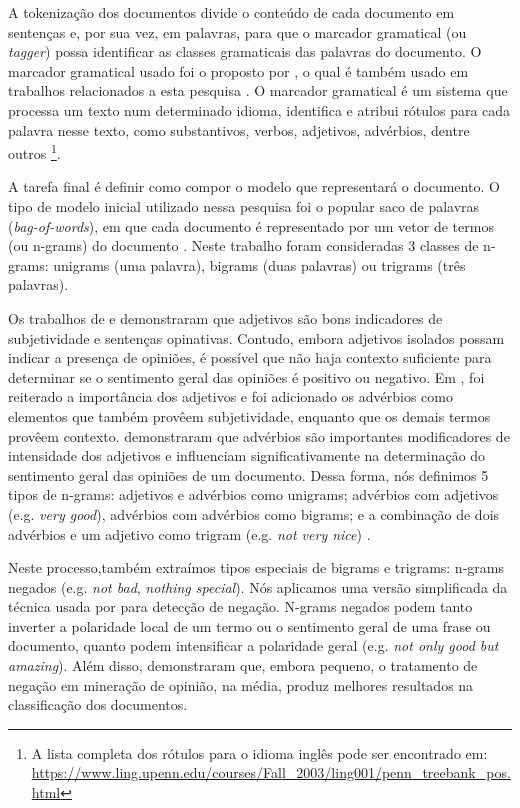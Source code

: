 \documentclass[template.tex]{subfiles}
\begin{document}
A tokenização dos documentos divide o conteúdo de cada documento em sentenças e, por sua vez, em palavras, para que o marcador gramatical (ou \textit{tagger}) possa identificar as classes gramaticais das palavras do documento. O marcador gramatical usado foi o proposto por , o qual é também usado em trabalhos relacionados a esta pesquisa \cite{chaovalit2005movie, taboada2008extracting, taboada2011lexicon}. O marcador gramatical é um sistema que processa um texto num determinado idioma, identifica e atribui rótulos para cada palavra nesse texto, como substantivos, verbos, adjetivos, advérbios, dentre outros \footnote{A lista completa dos rótulos para o idioma inglês pode ser encontrado em: \url{https://www.ling.upenn.edu/courses/Fall_2003/ling001/penn_treebank_pos.html}}. 

A tarefa final é definir como compor o modelo que representará o documento. O tipo de modelo inicial utilizado nessa pesquisa foi o popular saco de palavras (\textit{bag-of-words}), em que cada documento é representado por um vetor de termos (ou n-grams) do documento \cite{moraes2012document}. Neste trabalho foram consideradas 3 classes de n-grams: unigrams (uma palavra), bigrams (duas palavras) ou trigrams (três palavras). 

Os trabalhos de  e  demonstraram que adjetivos são bons indicadores de subjetividade e sentenças opinativas. Contudo, embora adjetivos isolados possam indicar a presença de opiniões, é possível que não haja contexto suficiente para determinar se o sentimento geral das opiniões é positivo ou negativo. Em , foi reiterado a importância dos adjetivos e  foi adicionado os advérbios como elementos que também provêem subjetividade, enquanto que os demais termos provêem contexto.  demonstraram que advérbios são importantes modificadores de intensidade dos adjetivos e influenciam significativamente na determinação do sentimento geral das opiniões de um documento. Dessa forma, nós definimos 5 tipos de n-grams: adjetivos e advérbios como unigrams; advérbios com adjetivos (e.g. \textit{very good}), advérbios com advérbios como bigrams; e a combinação de dois advérbios e um adjetivo como trigram (e.g. \textit{not very nice}) \cite{pang2002thumbs, turney2002thumbs, taboada2008extracting, karamibekr2012verb}. 

Neste processo,também extraímos tipos especiais de bigrams e trigrams: n-grams negados (e.g. \textit{not bad}, \textit{nothing special}). Nós aplicamos uma versão simplificada da técnica usada por  para detecção de negação. N-grams negados podem tanto inverter a polaridade local de um termo ou o sentimento geral de uma frase ou documento, quanto podem intensificar a polaridade geral (e.g. \textit{not only good but amazing}). Além disso,  demonstraram que, embora pequeno, o tratamento de negação em mineração de opinião, na média, produz melhores resultados na classificação dos documentos. 
\end{document}

